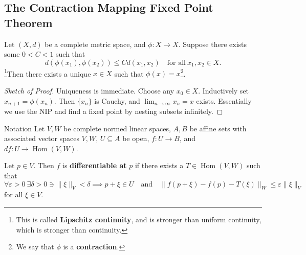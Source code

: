 \subsection{The Contraction Mapping Fixed Point Theorem}
\begin{theorem}
    Let $(X,d)$ be a complete metric space, and $\phi \colon X \to X$. Suppose there exists some $0<C<1$ such that \[
        d(\phi(x_1), \phi(x_2))\leq Cd(x_1,x_2) \quad \text{for all} \ x_1,x_2 \in X.
    \]\footnote{This is called \textbf{Lipschitz continuity}, and is stronger than uniform continuity, which is stronger than continuity.}Then there exists a unique $x \in X$ such that $\phi(x)=x$\footnote{We say that $\phi$ is a \textbf{contraction}.}.
\end{theorem}
\begin{proof}[Sketch of Proof]
    Uniqueness is immediate. Choose any $x_0 \in X$. Inductively set $x_{n+1}=\phi (x_n )$. Then $\{x_n \} $ is Cauchy, and $\lim _{n\to \infty}x_n  =x$ exists. Essentially we use the NIP and find a fixed point by nesting subsets infinitely.
\end{proof}
\begin{namedthing}{Notation}
    Let $V,W$ be complete normed linear spaces, $A,B$ be affine sets with associated vector spaces $V,W$, $U \subseteq A$ be open, $f \colon U \to B$, and $df \colon U \to \operatorname{Hom}(V,W)$.
\end{namedthing}
\begin{definition}[]
    Let $p \in V$. Then $f$ is \textbf{differentiable at} $p$ if there exists a $T \in \operatorname{Hom}(V,W)$ such that \[
        \forall \varepsilon >0 \ \exists \delta >0 \ni \|\xi\|_V<\delta \implies  p+\xi \in U \quad \text{and} \quad \|f(p+\xi)-f(p)-T(\xi)\|_W\leq \varepsilon \|\xi\|_V
    \] for all $\xi \in V$.
\end{definition}

